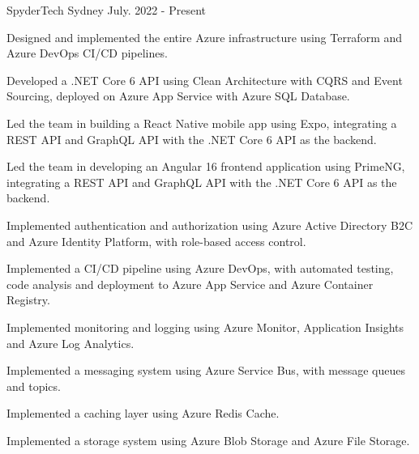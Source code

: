 
\begin{cventries}
  {SpyderTech} %
  {Sydney} %
  {July. 2022 - Present} %
  { \begin{cvitems} %
    \item {Designed and implemented the entire Azure infrastructure using Terraform and Azure DevOps CI/CD pipelines.}
    \item {Developed a .NET Core 6 API using Clean Architecture with CQRS and Event Sourcing, deployed on Azure App Service with Azure SQL Database.}
    \item {Led the team in building a React Native mobile app using Expo, integrating a REST API and GraphQL API with the .NET Core 6 API as the backend.}
    \item {Led the team in developing an Angular 16 frontend application using PrimeNG, integrating a REST API and GraphQL API with the .NET Core 6 API as the backend.}
    \item {Implemented authentication and authorization using Azure Active Directory B2C and Azure Identity Platform, with role-based access control.}
    \item {Implemented a CI/CD pipeline using Azure DevOps, with automated testing, code analysis and deployment to Azure App Service and Azure Container Registry.}
    \item {Implemented monitoring and logging using Azure Monitor, Application Insights and Azure Log Analytics.}
    \item {Implemented a messaging system using Azure Service Bus, with message queues and topics.}
    \item {Implemented a caching layer using Azure Redis Cache.}
    \item {Implemented a storage system using Azure Blob Storage and Azure File Storage.}
  \end{cvitems} }


\end{cventries}
